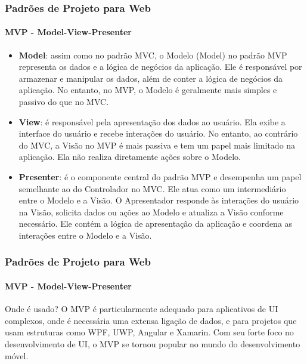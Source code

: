 \documentclass[
	9pt, %
	t, %
]{beamer}
\begin{document}
\begin{frame}
	\frametitle{Padrões de Projeto para Web}
	\framesubtitle{MVP - Model-View-Presenter}

	\begin{itemize}
		\item \textbf{Model}: assim como no padrão MVC, o Modelo (Model) no padrão MVP representa os dados e a lógica de negócios da aplicação. Ele é responsável por armazenar e manipular os dados, além de conter a lógica de negócios da aplicação. No entanto, no MVP, o Modelo é geralmente mais simples e passivo do que no MVC.
		\item \textbf{View}: é responsável pela apresentação dos dados ao usuário. Ela exibe a interface do usuário e recebe interações do usuário. No entanto, ao contrário do MVC, a Visão no MVP é mais passiva e tem um papel mais limitado na aplicação. Ela não realiza diretamente ações sobre o Modelo.
		\item \textbf{Presenter}: é o componente central do padrão MVP e desempenha um papel semelhante ao do Controlador no MVC. Ele atua como um intermediário entre o Modelo e a Visão. O Apresentador responde às interações do usuário na Visão, solicita dados ou ações ao Modelo e atualiza a Visão conforme necessário. Ele contém a lógica de apresentação da aplicação e coordena as interações entre o Modelo e a Visão.
	\end{itemize}

\end{frame}

\begin{frame}
	\frametitle{Padrões de Projeto para Web}
	\framesubtitle{MVP - Model-View-Presenter}

	\begin{block}{Onde é usado?}
		O MVP é particularmente adequado para aplicativos de \alert{UI complexos}, onde é necessária uma extensa ligação de dados, e para projetos que usam estruturas como WPF, UWP, Angular e Xamarin. Com seu forte foco no desenvolvimento de UI, o MVP se tornou popular no mundo do \alert{desenvolvimento móvel}.
	\end{block}

\end{frame}


\end{document}
